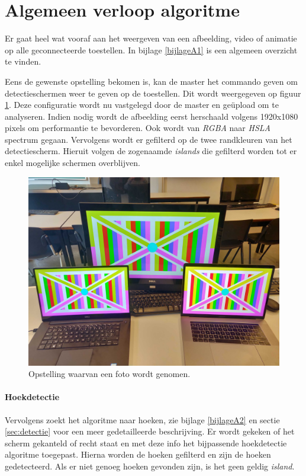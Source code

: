 \section{Algemeen verloop algoritme}
Er gaat heel wat vooraf aan het weergeven van een afbeelding, video of animatie op alle geconnecteerde toestellen. In bijlage \ref{bijlageA1} is een algemeen overzicht te vinden.

Eens de gewenste opstelling bekomen is, kan de master het commando geven om detectieschermen weer te geven op de toestellen. Dit wordt weergegeven op figuur \ref{fig:opstelling}. Deze configuratie wordt nu vastgelegd door de master en geüpload om te analyseren. Indien nodig wordt de afbeelding eerst herschaald volgens 1920x1080 pixels om performantie te bevorderen. Ook wordt van {\it RGBA} naar {\it HSLA} spectrum gegaan. Vervolgens wordt er gefilterd op de twee randkleuren van het detectiescherm. Hieruit volgen de zogenaamde {\it islands} die gefilterd worden tot er enkel mogelijke schermen overblijven.

\begin{figure}[H]
	\centering
	\includegraphics[scale=0.06]{img/opstelling.jpg}
	\caption{Opstelling waarvan een foto wordt genomen.}
	\label{fig:opstelling}
\end{figure}

\paragraph{Hoekdetectie}
Vervolgens zoekt het algoritme naar hoeken, zie bijlage \ref{bijlageA2} en sectie \ref{sec:detectie} voor een meer gedetailleerde beschrijving. Er wordt gekeken of het scherm gekanteld of recht staat en met deze info het bijpassende hoekdetectie algoritme toegepast. Hierna worden de hoeken gefilterd en zijn de hoeken gedetecteerd. Als er niet genoeg hoeken gevonden zijn, is het geen geldig {\it island}.

